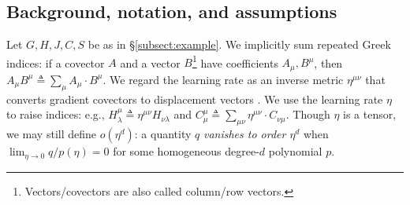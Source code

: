 \documentclass{article}
\theoremstyle{plain}
\theoremstyle{definition}
\begin{document}

\subsection{Background, notation, and assumptions} \label{sect:background}
       

        Let $G, H, J, C, S$ be as in \S \ref{subsect:example}.
        We implicitly sum repeated Greek indices: if a covector $A$ and a
        vector $B$\footnote{
            Vectors/covectors are also called column/row vectors.
        } have coefficients $A_\mu, B^\mu$, then 
        $
            A_\mu B^\mu
            \triangleq
            \sum_\mu A_\mu \cdot B^\mu
        $.
        We regard the learning rate as an
        inverse metric $\eta^{\mu\nu}$ that converts gradient covectors to
        displacement vectors \citep{bo13}.  We use the learning rate
        $\eta$ to raise indices: e.g.,
        $
            H^{\mu}_{\lambda}
            \triangleq
            \eta^{\mu\nu} H_{\nu\lambda}
        $ and
        $
            C^{\mu}_{\mu}
            \triangleq
            \sum_{\mu \nu} \eta^{\mu\nu} \cdot C_{\nu\mu}
        $.
        Though $\eta$ is a tensor, we may still define $o(\eta^d)$: a quantity
        $q$ \emph{vanishes to order $\eta^d$} when $\lim_{\eta\to 0} q/p(\eta)
        = 0$ for some homogeneous degree-$d$ polynomial $p$.



\end{document}
